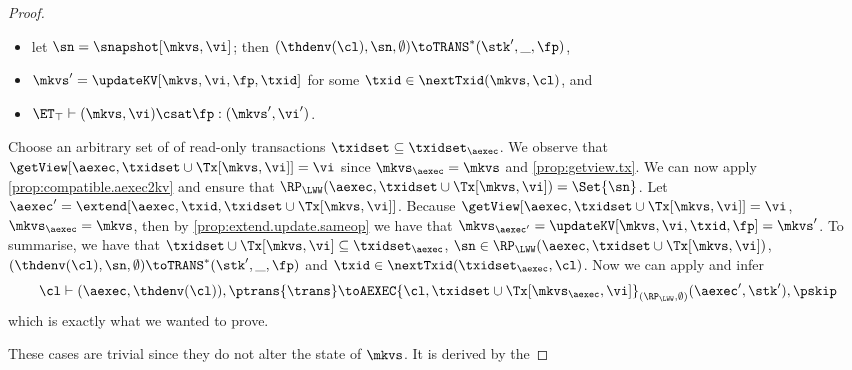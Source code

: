 \begin{proof}
\begin{itemize}
\item let $\sn = \snapshot[\mkvs, \vi]$; then $(\thdenv(\cl), \sn, \emptyset) \toTRANS^{\ast} (\stk', \_, \fp)$, 
\item $\mkvs' = \updateKV[\mkvs, \vi, \fp, \txid]$ for some $\txid \in \nextTxid(\mkvs, \cl)$, and
\item $\ET_{\top} \vdash (\mkvs, \vi) \csat \fp: (\mkvs',\vi')$.
\end{itemize}
Choose an arbitrary set of of read-only transactions $\txidset \subseteq \txidset_{\aexec}$.
We observe that $\getView[\aexec, \txidset \cup \Tx[\mkvs, \vi]] = \vi$ since $\mkvs_{\aexec} = \mkvs$ and \cref{prop:getview.tx}.
We can now apply \cref{prop:compatible.aexec2kv} and ensure that $\RP_{\LWW}(\aexec, \txidset \cup \Tx[\mkvs, \vi]) = \Set{\sn}$.
Let $\aexec' = \extend[\aexec, \txid, \txidset \cup \Tx[\mkvs, \vi]]$. 
Because $\getView[\aexec, \txidset \cup \Tx[\mkvs, \vi]] = \vi$, $\mkvs_{\aexec} = \mkvs$,
then by \cref{prop:extend.update.sameop} we have that $\mkvs_{\aexec'} = \updateKV[\mkvs, \vi, \txid, \fp] = \mkvs'$. 
To summarise, we have that $\txidset \cup \Tx[\mkvs, \vi] \subseteq \txidset_{\aexec}$, $\sn \in \RP_{\LWW}(\aexec, \txidset \cup \Tx[\mkvs, \vi])$,
$(\thdenv(\cl), \sn, \emptyset) \toTRANS^{\ast} (\stk', \_, \fp)$ and $\txid \in \nextTxid(\txidset_{\aexec}, \cl)$. 
Now we can apply  and infer
\[
\cl \vdash (\aexec, \thdenv(\cl)), \ptrans{\trans} \toAEXEC{\cl, \txidset \cup \Tx[\mkvs_{\aexec}, \vi]}_{(\RP_{\LWW}, \emptyset)} 
(\aexec', \stk'), \pskip
\]
which is exactly what we wanted to prove. 

These cases are trivial since they do not alter the state of \( \mkvs \).
It is derived by the \ih
\end{proof}

